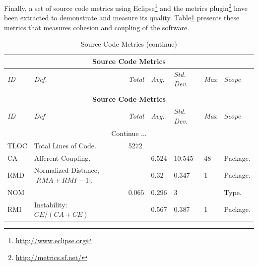 Finally, a set of source code metrics using Eclipse\footnote{\url{http://www.eclipse.org}} and the 
metrics plugin\footnote{\url{http://metrics.sf.net/}} have been extracted to demonstrate and measure its 
quality. Table\ref{tabla:metricas-valores} presents these metrics that measures cohesion and coupling 
of the software.
   \begin{longtable}{|p{1cm}|p{4cm}|p{1cm}|p{1cm}|p{1cm}|p{1cm}|p{1.5cm}|}
        
        \caption{Source Code Metrics} \label{tabla:metricas-valores}\\
        \hline
        \multicolumn{7}{|c|}{\textbf{Source Code Metrics}}\\
        \hline
        \textit{ID} &  \textit{Def.} &  \textit{Total} &  \textit{Avg.}& 
\textit{Std. Dev.} & \textit{Max}& \textit{Scope} \\ \hline
        \endfirsthead
        \caption[]{Source Code Metrics (continue)}\\
        \hline
        \multicolumn{7}{|c|}{\textbf{Source Code Metrics}}\\
        \hline
        \textit{ID} & \textit{Def} & \textit{Total} &  \textit{Avg.}& 
\textit{Std.
        Dev.} & \textit{Max}& \textit{Scope} \\ \hline
        \endhead
        \hline
        \multicolumn{7}{|c|}{Continue $\ldots$}\\
        \hline
        \endfoot
        \hline
        \endlastfoot
		TLOC&Total Lines of Code.&5272&&&& \\ \hline
    		CA&Afferent Coupling.&&$6.524$&$10.545$&48&Package.\\ \hline
		RMD&Normalized Distance, $|RMA + RMI - 1 |$.&&$0.32$&$0.347$&1&Package. \\ \hline
		NOM&&$0.065$&$0.296$&3&&Type. \\ \hline 
		RMI&Instability: $CE / (CA + CE)$&&$0.567$&$0.387$&1&Package. \\ \hline

\end{longtable}
